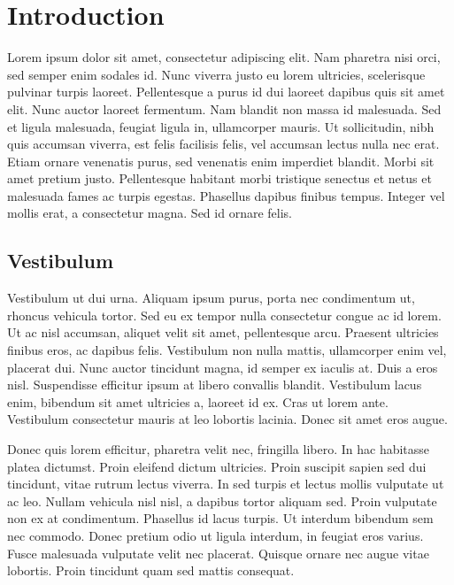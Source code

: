 
\chapter{Introduction}
\label{chap:introduction}

Lorem ipsum dolor sit amet, consectetur adipiscing elit. Nam pharetra nisi
orci, sed semper enim sodales id. Nunc viverra justo eu lorem ultricies,
scelerisque pulvinar turpis laoreet. Pellentesque a purus id dui laoreet
dapibus quis sit amet elit. Nunc auctor laoreet fermentum. Nam blandit non
massa id malesuada. Sed et ligula malesuada, feugiat ligula in, ullamcorper
mauris. Ut sollicitudin, nibh quis accumsan viverra, est felis facilisis felis,
vel accumsan lectus nulla nec erat. Etiam ornare venenatis purus, sed venenatis
enim imperdiet blandit. Morbi sit amet pretium justo. Pellentesque habitant
morbi tristique senectus et netus et malesuada fames ac turpis egestas.
Phasellus dapibus finibus tempus. Integer vel mollis erat, a consectetur magna.
Sed id ornare felis.

\section{Vestibulum}
Vestibulum ut dui urna. Aliquam ipsum purus, porta nec condimentum ut, rhoncus
vehicula tortor. Sed eu ex tempor nulla consectetur congue ac id lorem. Ut ac
nisl accumsan, aliquet velit sit amet, pellentesque arcu. Praesent ultricies
finibus eros, ac dapibus felis. Vestibulum non nulla mattis, ullamcorper enim
vel, placerat dui. Nunc auctor tincidunt magna, id semper ex iaculis at. Duis
a eros nisl. Suspendisse efficitur ipsum at libero convallis blandit.
Vestibulum lacus enim, bibendum sit amet ultricies a, laoreet id ex. Cras ut
lorem ante. Vestibulum consectetur mauris at leo lobortis lacinia. Donec sit
amet eros augue.

Donec quis lorem efficitur, pharetra velit nec, fringilla libero. In hac
habitasse platea dictumst. Proin eleifend dictum ultricies. Proin suscipit
sapien sed dui tincidunt, vitae rutrum lectus viverra. In sed turpis et lectus
mollis vulputate ut ac leo. Nullam vehicula nisl nisl, a dapibus tortor aliquam
sed. Proin vulputate non ex at condimentum. Phasellus id lacus turpis. Ut
interdum bibendum sem nec commodo. Donec pretium odio ut ligula interdum, in
feugiat eros varius. Fusce malesuada vulputate velit nec placerat. Quisque
ornare nec augue vitae lobortis. Proin tincidunt quam sed mattis consequat.

